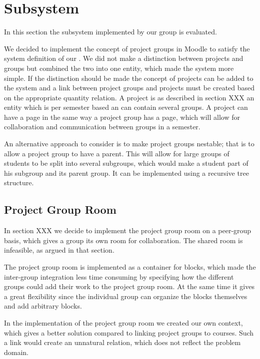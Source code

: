 \section{Subsystem}
In this section the subsystem implemented by our group is evaluated. 

We decided to implement the concept of project groups in Moodle to satisfy the system definition of our \system{}.
We did not make a distinction between projects and groups but combined the two into one entity, which made the system more simple. 
If the distinction should be made the concept of projects can be added to the system and a link between project groups and projects must be created based on the appropriate quantity relation. 
A project is as described in section XXX an entity which is per semester based an can contain several groups. 
A project can have a page in the same way a project group has a page, which will allow for collaboration and communication between groups in a semester. 

An alternative approach to consider is to make project groups nestable; that is to allow a project group to have a parent.
This will allow for large groups of students to be split into several subgroups, which would make a student part of his subgroup and its parent group.
It can be implemented using a recursive tree structure.



\subsection{Project Group Room}
In section XXX we decide to implement the project group room on a peer-group basis, which gives a group its own room for collaboration. %
The shared room is infeasible, as argued in that section. 

The project group room is implemented as a container for blocks, which made the inter-group integration less time consuming by specifying how the different groups could add their work to the project group room. 
At the same time it gives a great flexibility since the individual group can organize the blocks themselves and add arbitrary blocks.

In the implementation of the project group room we created our own context, which gives a better solution compared to linking project groups to courses. 
Such a link would create an unnatural relation, which does not reflect the problem domain.   

